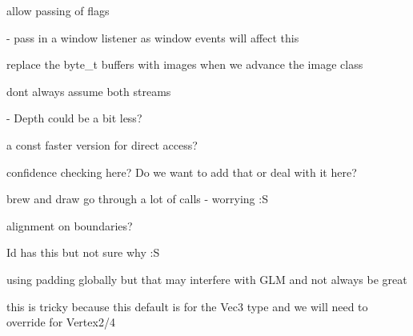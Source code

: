 \begin{DoxyRefList}
allow passing of flags  
\item[\label{todo__todo000011}%
\hypertarget{todo__todo000011}{}%
Member \hyperlink{classs9_1_1oculus_1_1OculusBase_a574e05f1890877cd2eb77f8fbbd9c553}{s9\-:\-:oculus\-:\-:Oculus\-Base\-:\-:Oculus\-Base} (bool b)]-\/ pass in a window listener as window events will affect this  
\item[\label{todo__todo000033}%
\hypertarget{todo__todo000033}{}%
Class \hyperlink{classs9_1_1oni_1_1OpenNIBase}{s9\-:\-:oni\-:\-:Open\-N\-I\-Base} ]replace the byte\-\_\-t buffers with images when we advance the image class  
\item[\label{todo__todo000012}%
\hypertarget{todo__todo000012}{}%
Member \hyperlink{classs9_1_1oni_1_1OpenNIBase_a466d4d6f769490e0703490004d7e9dcc}{s9\-:\-:oni\-:\-:Open\-N\-I\-Base\-:\-:Open\-N\-I\-Base} (const char $\ast$device\-U\-R\-I)]dont always assume both streams  
\item[\label{todo__todo000034}%
\hypertarget{todo__todo000034}{}%
Member \hyperlink{classs9_1_1oni_1_1OpenNIBase_1_1SharedObj_a95bcc43c79c432a446a88784ff5d1cc4}{s9\-:\-:oni\-:\-:Open\-N\-I\-Base\-:\-:Shared\-Obj\-:\-:tex\-\_\-buffer\-\_\-colour\-\_\-} ]-\/ Depth could be a bit less?  
\item[\label{todo__todo000035}%
\hypertarget{todo__todo000035}{}%
Member \hyperlink{classs9_1_1oni_1_1OpenNISkeleton_af498eae1a18c58a6e85670d319392ca2}{s9\-:\-:oni\-:\-:Open\-N\-I\-Skeleton\-:\-:s\-Visible\-Users} \mbox{[}S9\-\_\-\-N\-I\-T\-E\-\_\-\-M\-A\-X\-\_\-\-U\-S\-E\-R\-S\mbox{]}]a const faster version for direct access?  
\item[\label{todo__todo000013}%
\hypertarget{todo__todo000013}{}%
Member \hyperlink{classs9_1_1oni_1_1OpenNISkeleton_1_1User_a9475f7e337cb55fdd051b6b8a577d523}{s9\-:\-:oni\-:\-:Open\-N\-I\-Skeleton\-:\-:User\-:\-:copy\-Skeleton} ()]confidence checking here? Do we want to add that or deal with it here?  
\item[\label{todo__todo000040}%
\hypertarget{todo__todo000040}{}%
Class \hyperlink{classs9_1_1Shape}{s9\-:\-:Shape} ]brew and draw go through a lot of calls -\/ worrying \-:S  
\item[\label{todo__todo000041}%
\hypertarget{todo__todo000041}{}%
Class \hyperlink{structs9_1_1Skin_1_1SkinIndex}{s9\-:\-:Skin\-:\-:Skin\-Index} ]alignment on boundaries?  
\item[\label{todo__todo000042}%
\hypertarget{todo__todo000042}{}%
Member \hyperlink{structs9_1_1Skin_1_1SkinWeight_a8f9650be7ec3144f2fef974d18ef2555}{s9\-:\-:Skin\-:\-:Skin\-Weight\-:\-:bias} ]Id has this but not sure why \-:S  
\item[\label{todo__todo000038}%
\hypertarget{todo__todo000038}{}%
Class \hyperlink{structs9_1_1VertexT}{s9\-:\-:Vertex\-T$<$ T, U $>$} ]using padding globally but that may interfere with G\-L\-M and not always be great 

this is tricky because this default is for the Vec3 type and we will need to override for Vertex2/4 
\end{DoxyRefList}
